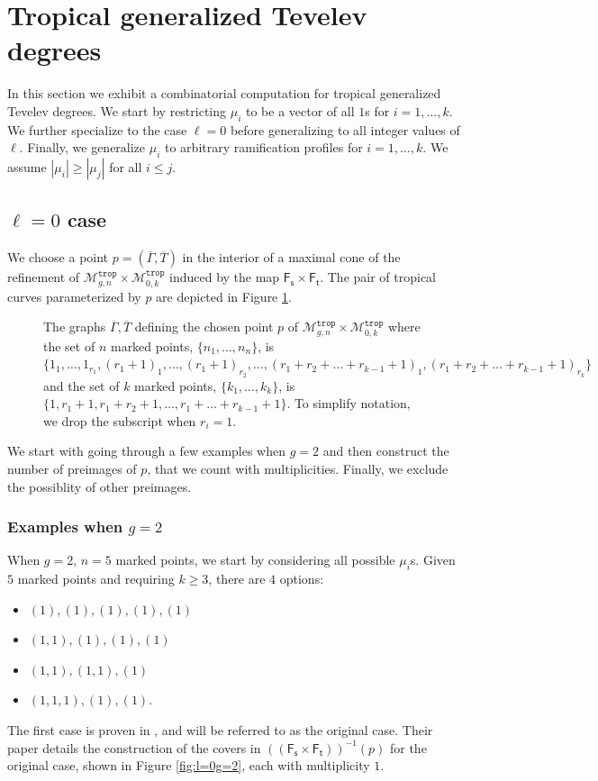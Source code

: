 \documentclass[11pt,reqno]{amsart}
\newcommand{\inputTikZ}[2]{%
     \resizebox{#1}{!}{}}
\theoremstyle{definition}
\newcommand\trop{{\mathtt{trop}}}
\newcommand\Mgn[1]{\mathcal M_{#1}}
\newcommand{\Ft}{\mathsf{F_t}}
\newcommand{\Fs}{\mathsf{F_s}}
\begin{document}
\section{Tropical generalized Tevelev degrees}
In this section we exhibit a combinatorial computation for tropical generalized Tevelev degrees. We start by restricting $\mu_i$ to be a vector of all $1$s for $i=1,\dots,k$. We further specialize to the case $\ell=0$ before generalizing to all integer values of $\ell$. Finally, we generalize $\mu_i$ to arbitrary ramification profiles for $i=1,\dots,k$. We assume $|\mu_i|\geq|\mu_j|$ for all $i\leq j$.

 \subsection{$\ell=0$ case}
 We choose a point $p = (\overline{\Gamma}, \overline{T})$ in the interior of a maximal cone of the refinement of $\Mgn{g,n}^\trop\times \Mgn{0,k}^\trop$ induced by the map $\Fs\times \Ft$. The pair of tropical curves parameterized by $p$ are depicted in Figure \ref{fig:newgenimage}.

 \begin{figure}[tb]
    \centering
    \inputTikZ{\textwidth}{Figures/newgenimage}
    \caption{The graphs $\overline{\Gamma}, \overline{T}$ defining the chosen point $p$ of $\Mgn{g,n}^\trop\times\Mgn{0,k}^\trop$ where the set of $n$ marked points, $\{n_1,\dots,n_n\}$, is $\{1_1,\dots,1_{r_1},(r_1+1)_1,\dots,(r_1+1)_{r_2},\dots,(r_1+r_2+\dots+r_{k-1}+1)_1,(r_1+r_2+\dots+r_{k-1}+1)_{r_k}\}$ and the set of $k$ marked points, $\{k_1,\dots,k_k\}$, is $\{1,r_1+1,r_1+r_2+1,\dots,r_1+\dots+r_{k-1}+1\}$. To simplify notation, we drop the subscript when $r_i=1$.}
    \label{fig:newgenimage}
\end{figure}
We start with going through a few examples when $g=2$ and then construct the number of preimages of $p$, that we count with multiplicities. Finally, we exclude the possiblity of other preimages.  

    \subsubsection*{Examples when $g=2$}

When $g=2$, $n=5$ marked points, we start by considering all possible $\mu_i$s. Given $5$ marked points and requiring $k\geq3$, there are $4$ options: \begin{itemize}
    \item $(1),(1),(1),(1),(1)$
    \item $(1,1),(1),(1),(1)$
    \item $(1,1),(1,1),(1)$
    \item $(1,1,1),(1),(1)$.
\end{itemize}
The first case is proven in \cite{troptev}, and will be referred to as the original case. Their paper details the construction of the covers in $((\Fs\times\Ft))^{-1}(p)$ for the original case, shown in Figure \ref{fig:l=0g=2}, each with multiplicity $1$.
\end{document}
